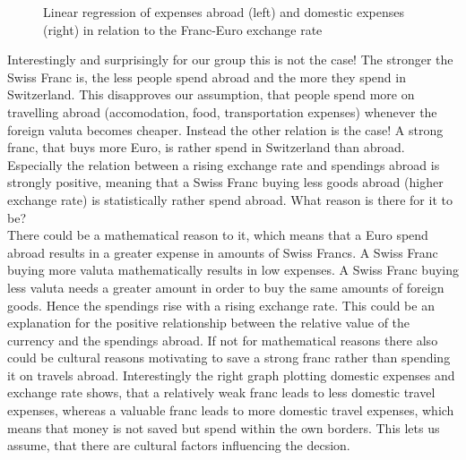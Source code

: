 \documentclass[12pt,a4paper,bibliography=totocnumbered,listof=totocnumbered]{scrartcl}
\begin{document}
\begin{figure}
\caption{Linear regression of expenses abroad (left) and domestic expenses (right) in relation to the Franc-Euro exchange rate}
\end{figure}
Interestingly and surprisingly for our group this is not the case! The stronger the Swiss Franc is, the less people spend abroad and the more they spend in Switzerland. This disapproves our assumption, that people spend more on travelling abroad (accomodation, food, transportation expenses) whenever the foreign valuta becomes cheaper. Instead the other relation is the case! A strong franc, that buys more Euro, is rather spend in Switzerland than abroad. Especially the relation between a rising exchange rate and spendings abroad is strongly positive, meaning that a Swiss Franc buying less goods abroad (higher exchange rate) is statistically rather spend abroad. What reason is there for it to be?\\ There could be a mathematical reason to it, which means that a Euro spend abroad results in a greater expense in amounts of Swiss Francs. A Swiss Franc buying more valuta mathematically results in low expenses. A Swiss Franc buying less valuta needs a greater amount in order to buy the same amounts of foreign goods. Hence the spendings rise with a rising exchange rate. This could be an explanation for the positive relationship between the relative value of the currency and the spendings abroad. If not for mathematical reasons there also could be cultural reasons motivating to save a strong franc rather than spending it on travels abroad. Interestingly the right graph plotting domestic expenses and exchange rate shows, that a relatively weak franc leads to less domestic travel expenses, whereas a valuable franc leads to more domestic travel expenses, which means that money is not saved but spend within the own borders. This lets us assume, that there are cultural factors influencing the decsion.
\\
\newpage
\end{document}
